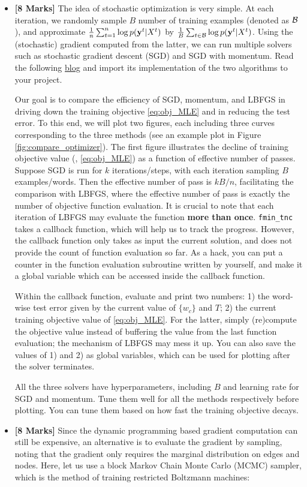 \documentclass[11pt]{report}
\begin{document}
\begin{itemize}
	\item[(4a)] {\bf [8 Marks]}
	 The idea of stochastic optimization is very simple. 
	At each iteration, we randomly sample $B$ number of training examples (denoted as $\mathcal{B}$), 
	and approximate $\frac{1}{n}\sum_{t=1}^n \log p(\mathbf{\boldsymbol{y}}^t | X^t)$
	by $\frac{1}{B}\sum_{t\in \mathcal{B}} \log p(\mathbf{\boldsymbol{y}}^t | X^t)$.
	Using the (stochastic) gradient computed from the latter, 
	we can run multiple solvers such as stochastic gradient descent (SGD)
	and SGD with momentum.
	Read the following \href{https://machinelearningmastery.com/gradient-descent-with-momentum-from-scratch/}{blog} and import its implementation of the two algorithms to your project.
	
	
	Our goal is to compare the efficiency of SGD, momentum, and LBFGS in driving down the training objective \eqref{eq:obj_MLE} and in reducing the test error.
	To this end, we will plot two figures, each including three curves corresponding to the  three methods (see an example plot in Figure \ref{fig:compare_optimizer}).
	The first figure illustrates the decline of training objective value (\ie, \eqref{eq:obj_MLE}) as a function of effective number of passes.
	Suppose SGD is run for $k$ iterations/steps, with each iteration sampling $B$ examples/words.
	Then the effective number of pass is $kB/n$,
	facilitating the comparison with LBFGS,
	where the effective number of pass is exactly the number of objective function evaluation.
	It is crucial to note that each iteration of LBFGS may evaluate the function \textbf{more than once}.
	\verb#fmin_tnc# takes a callback function, which will help us to track the progress.
	However, the callback function only takes as input the current solution,
	and does not provide the count of function evaluation so far.
	As a hack, you can put a counter in the function evaluation subroutine written by yourself,
	and make it a global variable which can be accessed inside the callback function.
	
	Within the callback function, evaluate and print two numbers: 
	1) the word-wise test error given by the current value of $\{w_c\}$ and $T$;
	2) the current training objective value of \eqref{eq:obj_MLE}.
	For the latter, simply (re)compute the objective value instead of buffering the value from the last function evaluation; the mechanism of LBFGS may mess it up.
	You can also save the values of 1) and 2) as global variables,
	which can be used for plotting after the solver terminates.
	 
	All the three solvers have hyperparameters, including $B$ and learning rate for SGD and momentum.
	Tune them well for all the methods respectively before plotting.
	You can tune them based on how fast the training objective decays.
	\item[(4b)] {\bf [8 Marks]} 
	Since the dynamic programming based gradient computation can still be expensive,
	an alternative is to evaluate the gradient by sampling,
	noting that the gradient only requires the marginal distribution on edges and nodes.
	Here, let us use a block Markov Chain Monte Carlo (MCMC) sampler,
	which is the method of training restricted Boltzmann machines:	
	

\end{itemize}
\end{document}

